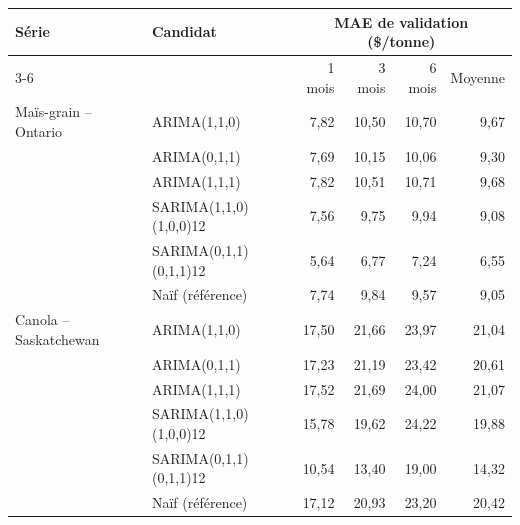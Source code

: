 \begin{tabular}{llrrrr}
\toprule
Série & Candidat & \multicolumn{4}{c}{MAE de validation (\$/tonne)} \\
\cmidrule(lr){3-6}
& & 1 mois & 3 mois & 6 mois & Moyenne \\
\midrule
Maïs-grain -- Ontario & ARIMA(1,1,0) & 7,82 & 10,50 & 10,70 & 9,67 \\
 & ARIMA(0,1,1) & 7,69 & 10,15 & 10,06 & 9,30 \\
 & ARIMA(1,1,1) & 7,82 & 10,51 & 10,71 & 9,68 \\
 & SARIMA(1,1,0)(1,0,0)12 & 7,56 & 9,75 & 9,94 & 9,08 \\
 & SARIMA(0,1,1)(0,1,1)12 & 5,64 & 6,77 & 7,24 & 6,55 \\
 & Naïf (référence) & 7,74 & 9,84 & 9,57 & 9,05 \\
\midrule
Canola -- Saskatchewan & ARIMA(1,1,0) & 17,50 & 21,66 & 23,97 & 21,04 \\
 & ARIMA(0,1,1) & 17,23 & 21,19 & 23,42 & 20,61 \\
 & ARIMA(1,1,1) & 17,52 & 21,69 & 24,00 & 21,07 \\
 & SARIMA(1,1,0)(1,0,0)12 & 15,78 & 19,62 & 24,22 & 19,88 \\
 & SARIMA(0,1,1)(0,1,1)12 & 10,54 & 13,40 & 19,00 & 14,32 \\
 & Naïf (référence) & 17,12 & 20,93 & 23,20 & 20,42 \\
\bottomrule
\end{tabular}
